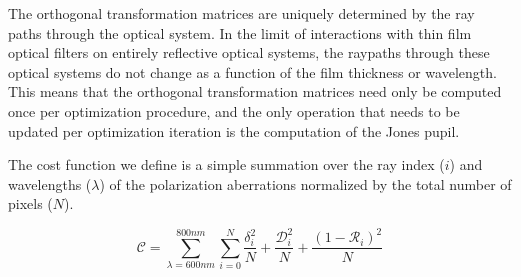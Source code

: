 The orthogonal transformation matrices are uniquely determined by the ray paths through the optical system. In the limit of interactions with thin film optical filters on entirely reflective optical systems, the raypaths through these optical systems do not change as a function of the film thickness or wavelength. This means that the orthogonal transformation matrices need only be computed once per optimization procedure, and the only operation that needs to be updated per optimization iteration is the computation of the Jones pupil.

The cost function we define is a simple summation over the ray index ($i$) and wavelengths ($\lambda$) of the polarization aberrations normalized by the total number of pixels ($N$). 

\begin{equation}
    \mathcal{C} = \sum_{\lambda = 600nm}^{800nm} \sum_{i=0}^{N} \frac{\delta_{i}^{2}}{N} + \frac{\mathcal{D}_{i}^{2}}{N} + \frac{(1-\mathcal{R}_{i})^{2}}{N}
\end{equation}





